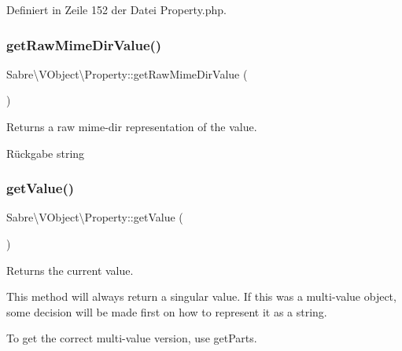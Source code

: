 Definiert in Zeile 152 der Datei Property.\+php.

\mbox{\label{class_sabre_1_1_v_object_1_1_property_ac536713167811c630d88963900814c44}} 
\subsubsection{\texorpdfstring{get\+Raw\+Mime\+Dir\+Value()}{getRawMimeDirValue()}}
{\footnotesize\ttfamily Sabre\textbackslash{}\+V\+Object\textbackslash{}\+Property\+::get\+Raw\+Mime\+Dir\+Value (\begin{DoxyParamCaption}{ }\end{DoxyParamCaption})\hspace{0.3cm}{\ttfamily [abstract]}}

Returns a raw mime-\/dir representation of the value.

\begin{DoxyReturn}{Rückgabe}
string 
\end{DoxyReturn}
\mbox{\label{class_sabre_1_1_v_object_1_1_property_a9813d84d8d1f59231f69a729505227a9}} 
\subsubsection{\texorpdfstring{get\+Value()}{getValue()}}
{\footnotesize\ttfamily Sabre\textbackslash{}\+V\+Object\textbackslash{}\+Property\+::get\+Value (\begin{DoxyParamCaption}{ }\end{DoxyParamCaption})}

Returns the current value.

This method will always return a singular value. If this was a multi-\/value object, some decision will be made first on how to represent it as a string.

To get the correct multi-\/value version, use get\+Parts.

